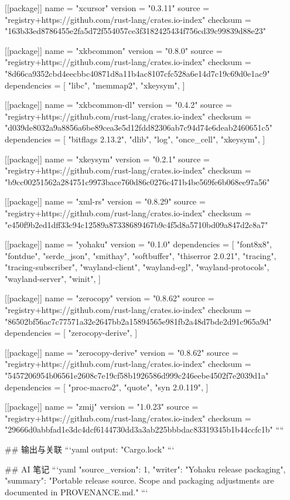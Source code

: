 [[package]]
name = "xcursor"
version = "0.3.11"
source = "registry+https://github.com/rust-lang/crates.io-index"
checksum = "163b33ed8786455e2fa5d72f554057ce3f3182425434f756cd39c99839d88e23"

[[package]]
name = "xkbcommon"
version = "0.8.0"
source = "registry+https://github.com/rust-lang/crates.io-index"
checksum = "8d66ca9352cbd4eecbbc40871d8a11b4ac8107cfc528a6e14d7c19c69d0e1ac9"
dependencies = [
 "libc",
 "memmap2",
 "xkeysym",
]

[[package]]
name = "xkbcommon-dl"
version = "0.4.2"
source = "registry+https://github.com/rust-lang/crates.io-index"
checksum = "d039de8032a9a8856a6be89cea3e5d12fdd82306ab7c94d74e6deab2460651c5"
dependencies = [
 "bitflags 2.13.2",
 "dlib",
 "log",
 "once_cell",
 "xkeysym",
]

[[package]]
name = "xkeysym"
version = "0.2.1"
source = "registry+https://github.com/rust-lang/crates.io-index"
checksum = "b9cc00251562a284751c9973bace760d86c0276c471b4be569fe6b068ee97a56"

[[package]]
name = "xml-rs"
version = "0.8.29"
source = "registry+https://github.com/rust-lang/crates.io-index"
checksum = "e450f9b2ed1dff33c94c12589a87338689467b9c4f5d8a5710bd09a847d2c8a7"

[[package]]
name = "yohaku"
version = "0.1.0"
dependencies = [
 "font8x8",
 "fontdue",
 "serde_json",
 "smithay",
 "softbuffer",
 "thiserror 2.0.21",
 "tracing",
 "tracing-subscriber",
 "wayland-client",
 "wayland-egl",
 "wayland-protocols",
 "wayland-server",
 "winit",
]

[[package]]
name = "zerocopy"
version = "0.8.62"
source = "registry+https://github.com/rust-lang/crates.io-index"
checksum = "86502bf56ac7c77571a32e2647bb2a15894565e981fb2a48d7bde2d91c965a9d"
dependencies = [
 "zerocopy-derive",
]

[[package]]
name = "zerocopy-derive"
version = "0.8.62"
source = "registry+https://github.com/rust-lang/crates.io-index"
checksum = "5457206954b06561e2608c7e19cf58b1926586d999c246eebe4502f7e2039d1a"
dependencies = [
 "proc-macro2",
 "quote",
 "syn 2.0.119",
]

[[package]]
name = "zmij"
version = "1.0.23"
source = "registry+https://github.com/rust-lang/crates.io-index"
checksum = "29666d0abbfad1e3dc4dcf6144730dd3a3ab225bbbdac83319345b1b44ccfc1b"
````

## 输出与关联
```yaml
output: "Cargo.lock"
```

## AI 笔记
```yaml
{"source_version": 1, "writer": "Yohaku release packaging", "summary": "Portable release source. Scope and packaging adjustments are documented in PROVENANCE.md."}
```

